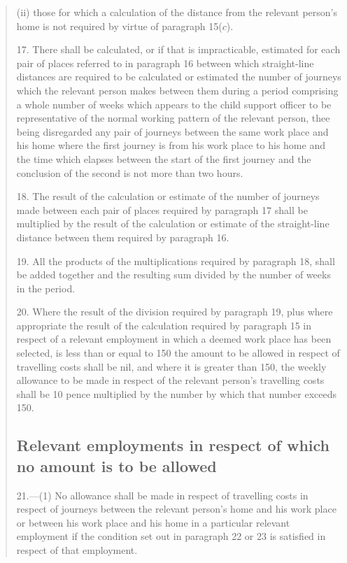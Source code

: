 \documentclass[a4paper]{article}
\begin{document}
\begin{quotation}
\begin{enumerate}
\begin{enumerate}
(ii) those for which a calculation of the distance from the relevant person’s home is not required by virtue of paragraph 15($c$).
\end{enumerate}
\end{enumerate}

\medskip

17.  There shall be calculated, or if that is impracticable, estimated for each pair of places referred to in paragraph 16 between which straight-line distances are required to be calculated or estimated the number of journeys which the relevant person makes between them during a period comprising a whole number of weeks which appears to the child support officer to be representative of the normal working pattern of the relevant person, thee being disregarded any pair of journeys between the same work place and his home where the first journey is from his work place to his home and the time which elapses between the start of the first journey and the conclusion of the second is not more than two hours.

\medskip

18.  The result of the calculation or estimate of the number of journeys made between each pair of places required by paragraph 17 shall be multiplied by the result of the calculation or estimate of the straight-line distance between them required by paragraph 16.

\medskip

19.  All the products of the multiplications required by paragraph 18, shall be added together and the resulting sum divided by the number of weeks in the period.

\medskip

20.  Where the result of the division required by paragraph 19, plus where appropriate the result of the calculation required by paragraph 15 in respect of a relevant employment in which a deemed work place has been selected, is less than or equal to 150 the amount to be allowed in respect of travelling costs shall be nil, and where it is greater than 150, the weekly allowance to be made in respect of the relevant person’s travelling costs shall be 10 pence multiplied by the number by which that number exceeds 150.

\subsection*{Relevant employments in respect of which no amount is to be allowed}

21.—(1) No allowance shall be made in respect of travelling costs in respect of journeys between the relevant person’s home and his work place or between his work place and his home in a particular relevant employment if the condition set out in paragraph 22 or 23 is satisfied in respect of that employment.


\end{quotation}
\end{document}
